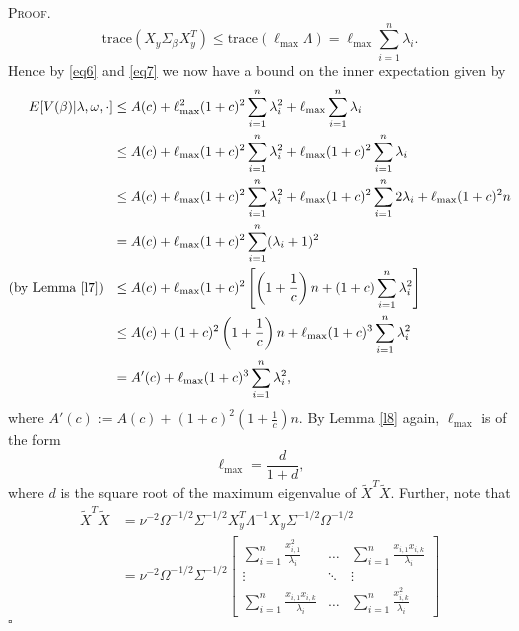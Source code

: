 \documentclass[12pt]{article}
\newcounter{ProofCounter}
\newenvironment{Proof}{\stepcounter{ProofCounter}\textsc{Proof.}}{\hfill$\square$}
\numberwithin{equation}{section}
\begin{document}
\begin{Proof}
  \begin{equation}
    \text{trace}(X_y \Sigma_\beta X_{y}^T) \leq \text{trace}(\ell_{\max} \Lambda) = \ell_{\max} \sum_{i=1}^{n} \lambda_i.
    \label{eq7}
  \end{equation}
  Hence by \eqref{eq6} and \eqref{eq7} we now have a bound on the inner expectation given by 
  \begin{align}
    E[V(\beta) | \lambda, \omega, \cdot] & \leq A(c) + \ell_{\max}^2(1 + c)^2 \sum_{i=1}^{n} \lambda_i^2 + \ell_{\max} \sum_{i=1}^{n} \lambda_i
    \nonumber \\
    & \leq A(c) + \ell_{\max}(1 + c)^2 \sum_{i=1}^{n}\lambda_i^2 + \ell_{\max}(1 + c)^2 \sum_{i=1}^{n}\lambda_i \nonumber \\
    & \leq A(c) + \ell_{\max}(1 + c)^2 \sum_{i=1}^{n}\lambda_i^2 + \ell_{\max}(1 + c)^2 \sum_{i=1}^{n}2\lambda_i  + \ell_{\max}(1 + c)^2 n \nonumber \\
    & = A(c) + \ell_{\max}(1 + c)^2 \sum_{i=1}^{n}(\lambda_i + 1)^2 \nonumber \\
    \text{(by Lemma \ref{l7}) } \ & \leq A(c) + \ell_{\max}(1 + c)^2 \left[ \left( 1 + \frac{1}{c} \right)n + (1 + c)\sum_{i=1}^{n}\lambda_i^2 \right] \nonumber \\
    & \leq A(c) + (1 + c)^2\left( 1 + \frac{1}{c} \right)n + \ell_{\max}(1 + c)^3 \sum_{i=1}^{n} \lambda_i^2 \nonumber \\
    & = A'(c) + \ell_{\max}(1 + c)^3 \sum_{i=1}^{n} \lambda_i^2,
    \label{eq9}
  \end{align}
  where $A'(c) := A(c) + (1 + c)^2\left( 1 + \frac{1}{c} \right)n$. By Lemma \ref{l8} again, $\ell_{\max}$ is of the form 
  \begin{equation}
    \ell_{\max} = \frac{d}{1 + d}, 
    \label{eq10}
  \end{equation}
  where $d$ is the square root of the maximum eigenvalue of $\tilde{X}^T
  \tilde{X}$. Further, note that 
  \begin{align*}
    \tilde{X}^T \tilde{X} & = \nu^{-2} \Omega^{-1/2}\Sigma^{-1/2} X_y^T \Lambda^{-1} X_y \Sigma^{-1/2}\Omega^{-1/2} \\
    & = \nu^{-2} \Omega^{-1/2}\Sigma^{-1/2} \begin{bmatrix}
      \sum_{i=1}^{n}\frac{x_{i,1}^2}{\lambda_i} & \dots & \sum_{i=1}^{n}\frac{ x_{i,1}x_{i,k}}{\lambda_i} \\
      \vdots & \ddots & \vdots \\
      \sum_{i=1}^{n} \frac{x_{i,1}x_{i,k}}{\lambda_i} & \dots & \sum_{i=1}^{n}\frac{ x_{i,k}^2}{\lambda_i}

\end{bmatrix}
\end{align*}
\end{Proof}
\end{document}
